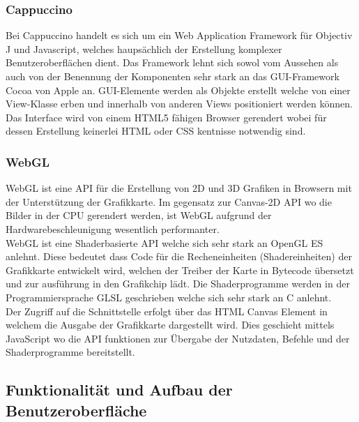 \subsubsection{Cappuccino}
\label{sec:Cappuccino}
Bei Cappuccino handelt es sich um ein Web Application Framework für Objectiv J und Javascript, welches haupsächlich der Erstellung komplexer Benutzeroberflächen dient.
Das Framework lehnt sich sowol vom Aussehen als auch von der Benennung der Komponenten sehr stark an das GUI-Framework Cocoa von Apple an.
GUI-Elemente werden als Objekte erstellt welche von einer View-Klasse erben und innerhalb von anderen Views positioniert werden können.
Das Interface wird von einem HTML5 fähigen Browser gerendert wobei für dessen Erstellung keinerlei HTML oder CSS kentnisse notwendig sind.


\subsubsection{WebGL}
\label{sec:WebGL}
WebGL ist eine API für die Erstellung von 2D und 3D Grafiken in Browsern mit der Unterstützung der Grafikkarte.
Im gegensatz zur Canvas-2D API wo die Bilder in der CPU gerendert werden, ist WebGL aufgrund der Hardwarebeschleunigung wesentlich performanter.
\\
WebGL ist eine Shaderbasierte API welche sich sehr stark an OpenGL ES anlehnt.
Diese bedeutet dass Code für die Recheneinheiten (Shadereinheiten) der Grafikkarte entwickelt wird,
welchen der Treiber der Karte in Bytecode übersetzt und zur ausführung in den Grafikchip lädt.
Die Shaderprogramme werden in der Programmiersprache GLSL geschrieben welche sich sehr stark an C anlehnt.
\\
Der Zugriff auf die Schnittstelle erfolgt über das HTML Canvas Element in welchem die Ausgabe der Grafikkarte dargestellt wird.
Dies geschieht mittels JavaScript wo die API funktionen zur Übergabe der Nutzdaten, Befehle und der Shaderprogramme bereitstellt.


\subsection{Funktionalität und Aufbau der Benutzeroberfläche}
\label{sec:Funktionalität und Aufbau der Benutzeroberfläche}


